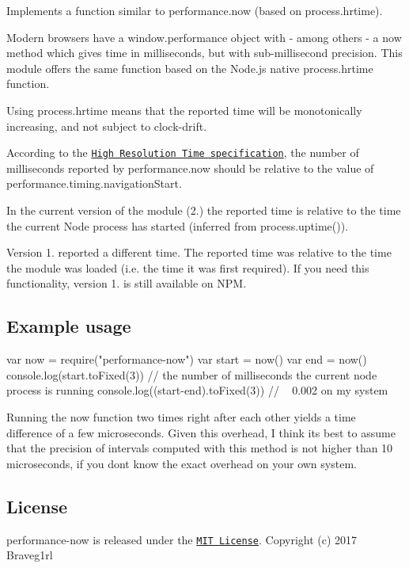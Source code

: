 Implements a function similar to {\ttfamily performance.\+now} (based on {\ttfamily process.\+hrtime}).

Modern browsers have a {\ttfamily window.\+performance} object with -\/ among others -\/ a {\ttfamily now} method which gives time in milliseconds, but with sub-\/millisecond precision. This module offers the same function based on the Node.\+js native {\ttfamily process.\+hrtime} function.

Using {\ttfamily process.\+hrtime} means that the reported time will be monotonically increasing, and not subject to clock-\/drift.

According to the \href{http://www.w3.org/TR/hr-time/}{\tt High Resolution Time specification}, the number of milliseconds reported by {\ttfamily performance.\+now} should be relative to the value of {\ttfamily performance.\+timing.\+navigation\+Start}.

In the current version of the module (2.) the reported time is relative to the time the current Node process has started (inferred from {\ttfamily process.\+uptime()}).

Version 1. reported a different time. The reported time was relative to the time the module was loaded (i.\+e. the time it was first {\ttfamily require}d). If you need this functionality, version 1. is still available on N\+PM.

\subsection*{Example usage}


\begin{DoxyCode}
var now = require("performance-now")
var start = now()
var end = now()
console.log(start.toFixed(3)) // the number of milliseconds the current node process is running
console.log((start-end).toFixed(3)) // ~ 0.002 on my system
\end{DoxyCode}


Running the now function two times right after each other yields a time difference of a few microseconds. Given this overhead, I think it\textquotesingle{}s best to assume that the precision of intervals computed with this method is not higher than 10 microseconds, if you don\textquotesingle{}t know the exact overhead on your own system.

\subsection*{License}

performance-\/now is released under the \href{http://opensource.org/licenses/MIT}{\tt M\+IT License}. Copyright (c) 2017 Braveg1rl 